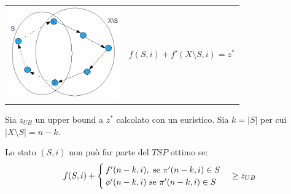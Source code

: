 \begin{table}[!h]
	\begin{tabular}{m{8cm} m{7.5cm}}
		\includegraphics[height=4cm]{images/graph50.png} &
		\begin{equation*}
			f(S,i)+f'(X\setminus S,i)=z^{*}
		\end{equation*}
	\end{tabular}
\end{table}
Sia $z_{UB}$ un upper bound a $z^{*}$ calcolato con un euristico. Sia $k=|S|$ per cui $|X\setminus S|=n-k$.

Lo stato $(S,i)$ non può far parte del $TSP$ ottimo se:
\begin{equation*}
	f(S,i)+
	\begin{cases}
		f'(n-k,i),\ \textnormal{se }\pi'(n-k,i)\in S \\
		\phi'(n-k,i)\ \textnormal{se }\pi'(n-k,i)\in S
	\end{cases}
	\ge z_{UB}
\end{equation*}

